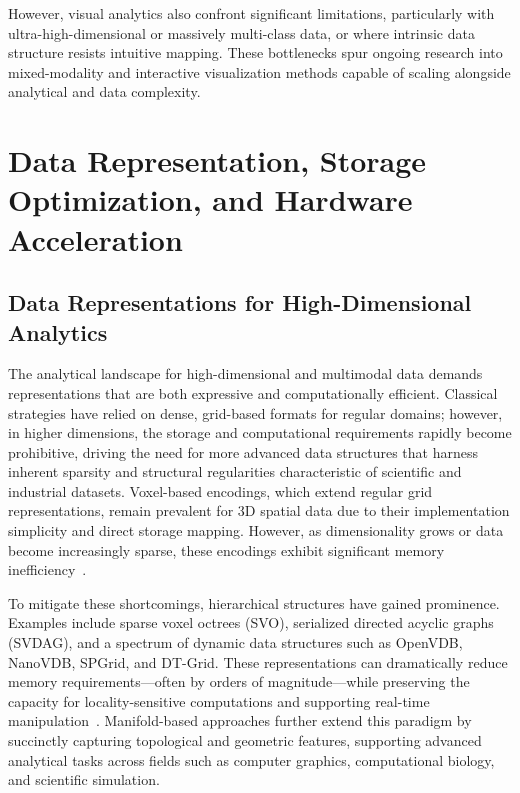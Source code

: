 \documentclass[sigconf]{acmart}
\begin{document}
However, visual analytics also confront significant limitations, particularly with ultra-high-dimensional or massively multi-class data, or where intrinsic data structure resists intuitive mapping. These bottlenecks spur ongoing research into mixed-modality and interactive visualization methods capable of scaling alongside analytical and data complexity.

\section{Data Representation, Storage Optimization, and Hardware Acceleration}
\label{sec:data-representation-optimization}

\subsection{Data Representations for High-Dimensional Analytics}

The analytical landscape for high-dimensional and multimodal data demands representations that are both expressive and computationally efficient. Classical strategies have relied on dense, grid-based formats for regular domains; however, in higher dimensions, the storage and computational requirements rapidly become prohibitive, driving the need for more advanced data structures that harness inherent sparsity and structural regularities characteristic of scientific and industrial datasets. Voxel-based encodings, which extend regular grid representations, remain prevalent for 3D spatial data due to their implementation simplicity and direct storage mapping. However, as dimensionality grows or data become increasingly sparse, these encodings exhibit significant memory inefficiency~\cite{ref86}.

To mitigate these shortcomings, hierarchical structures have gained prominence. Examples include sparse voxel octrees (SVO), serialized directed acyclic graphs (SVDAG), and a spectrum of dynamic data structures such as OpenVDB, NanoVDB, SPGrid, and DT-Grid. These representations can dramatically reduce memory requirements---often by orders of magnitude---while preserving the capacity for locality-sensitive computations and supporting real-time manipulation~\cite{ref86}. Manifold-based approaches further extend this paradigm by succinctly capturing topological and geometric features, supporting advanced analytical tasks across fields such as computer graphics, computational biology, and scientific simulation.
\end{document}
